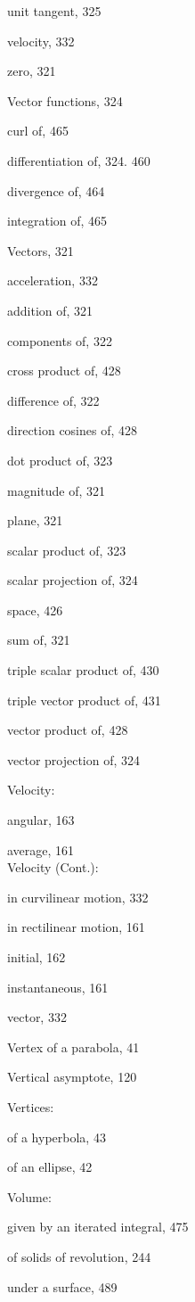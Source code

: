 \documentclass[10pt]{article}
\begin{document}
unit tangent, 325

velocity, 332

zero, 321

Vector functions, 324

curl of, 465

differentiation of, 324. 460

divergence of, 464

integration of, 465

Vectors, 321

acceleration, 332

addition of, 321

components of, 322

cross product of, 428

difference of, 322

direction cosines of, 428

dot product of, 323

magnitude of, 321

plane, 321

scalar product of, 323

scalar projection of, 324

space, 426

sum of, 321

triple scalar product of, 430

triple vector product of, 431

vector product of, 428

vector projection of, 324

Velocity:

angular, 163

average, 161\\
Velocity (Cont.):

in curvilinear motion, 332

in rectilinear motion, 161

initial, 162

instantaneous, 161

vector, 332

Vertex of a parabola, 41

Vertical asymptote, 120

Vertices:

of a hyperbola, 43

of an ellipse, 42

Volume:

given by an iterated integral, 475

of solids of revolution, 244

under a surface, 489
\end{document}
